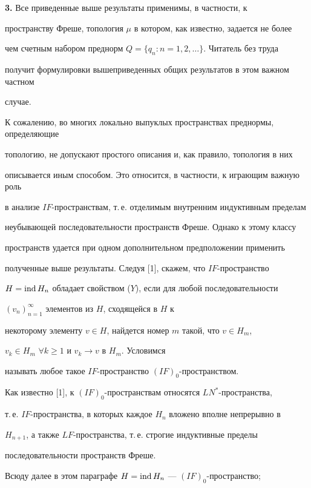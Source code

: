 {\bf 3.} Все приведенные выше результаты применимы, в частности, к


пространству Фреше, топология $\mu$ в котором, как известно, задается не более


чем счетным набором преднорм $Q=\{q_n:n=1,2,\dotsc\}$. Читатель без труда


получит формулировки вышеприведенных общих результатов в этом важном частном


случае.





К сожалению, во многих локально выпуклых пространствах преднормы, определяющие


топологию, не допускают простого описания и, как правило, топология в них


описывается иным способом. Это относится, в частности, к играющим важную роль


в анализе $IF$-пространствам, т.\,е. отделимым внутренним индуктивным пределам


неубывающей последовательности пространств Фреше. Однако к этому классу


пространств удается при одном дополнительном предположении применить


полученные выше результаты. Следуя [1], скажем, что $IF$-пространство


$H=\ind H_n$ обладает свойством ($Y$), если для любой последовательности


$(v_n)_{n=1}^{\infty}$ элементов из $H$, сходящейся в $H$ к


некоторому элементу $v\in H$, найдется номер $m$ такой, что $v\in H_m$,


$v_k\in H_m$ $\forall k\geqslant 1$ и $v_k\to v$ в $H_m$. Условимся


называть любое такое $IF$-пространство  $(IF)_0$-пространством.





Как известно [1], к $(IF)_0$-пространствам относятся $LN^*$-пространства,


т.\,е. $IF$-пространства, в которых каждое $H_n$ вложено вполне непрерывно в


$H_{n+1}$, а также $LF$-пространства, т.\,е. строгие индуктивные пределы


последовательности пространств Фреше.





Всюду далее в этом параграфе $H=\ind H_n$ --- $(IF)_0$-пространство;


